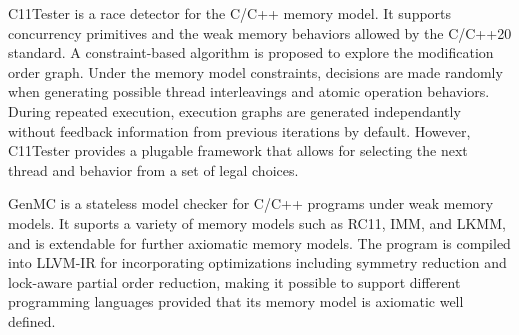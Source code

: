 C11Tester \cite{c11tester} is a race detector for the C/C++ memory model. It supports concurrency primitives and the weak memory behaviors allowed by the C/C++20 standard. A constraint-based algorithm is proposed to explore the modification order graph. Under the memory model constraints, decisions are made randomly when generating possible thread interleavings and atomic operation behaviors. During repeated execution, execution graphs are generated independantly without feedback information from previous iterations by default. However, C11Tester provides a plugable framework that allows for selecting the next thread and behavior from a set of legal choices.   

GenMC \cite{genmc} is a stateless model checker for C/C++ programs under weak memory models. It suports a variety of memory models such as  RC11, IMM, and LKMM, and is extendable for  further axiomatic memory models. The program is compiled into LLVM-IR for incorporating optimizations including symmetry reduction and lock-aware partial order reduction, making it possible to support different programming languages provided that its memory model is axiomatic well defined. 

 


   


